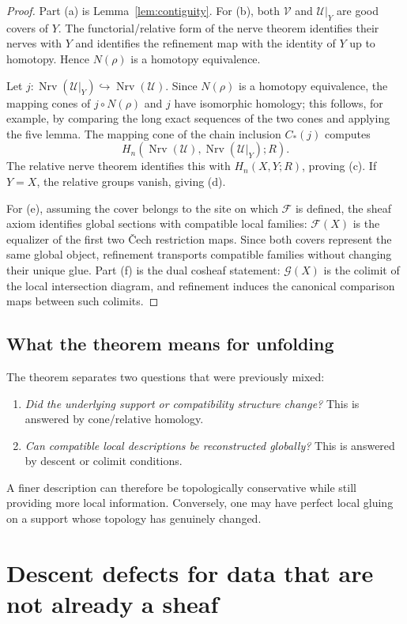 \documentclass[11pt]{article}
\newcommand{\Nrv}{\operatorname{Nrv}}
\begin{document}
\begin{proof}
Part (a) is Lemma~\ref{lem:contiguity}.  For (b), both $\mathcal V$ and $\mathcal U|_Y$ are good covers of $Y$.  The functorial/relative form of the nerve theorem identifies their nerves with $Y$ and identifies the refinement map with the identity of $Y$ up to homotopy.  Hence $N(\rho)$ is a homotopy equivalence.

Let $j:\Nrv(\mathcal U|_Y)\hookrightarrow\Nrv(\mathcal U)$.  Since $N(\rho)$ is a homotopy equivalence, the mapping cones of $j\circ N(\rho)$ and $j$ have isomorphic homology; this follows, for example, by comparing the long exact sequences of the two cones and applying the five lemma.  The mapping cone of the chain inclusion $C_*(j)$ computes
\[
H_n(\Nrv(\mathcal U),\Nrv(\mathcal U|_Y);R).
\]
The relative nerve theorem identifies this with $H_n(X,Y;R)$, proving (c).  If $Y=X$, the relative groups vanish, giving (d).

For (e), assuming the cover belongs to the site on which $\mathcal F$ is defined, the sheaf axiom identifies global sections with compatible local families: $\mathcal F(X)$ is the equalizer of the first two \v{C}ech restriction maps.  Since both covers represent the same global object, refinement transports compatible families without changing their unique glue.  Part (f) is the dual cosheaf statement: $\mathcal G(X)$ is the colimit of the local intersection diagram, and refinement induces the canonical comparison maps between such colimits.
\end{proof}

\subsection{What the theorem means for unfolding}
The theorem separates two questions that were previously mixed:
\begin{enumerate}[label=(\roman*)]
\item \emph{Did the underlying support or compatibility structure change?}  This is answered by cone/relative homology.
\item \emph{Can compatible local descriptions be reconstructed globally?}  This is answered by descent or colimit conditions.
\end{enumerate}
A finer description can therefore be topologically conservative while still providing more local information.  Conversely, one may have perfect local gluing on a support whose topology has genuinely changed.

\section{Descent defects for data that are not already a sheaf}
\end{document}
